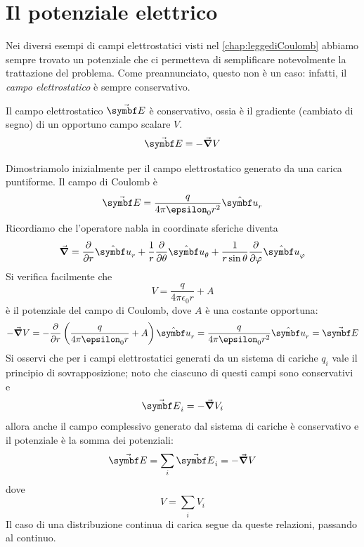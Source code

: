 \section{Il potenziale elettrico}
Nei diversi esempi di campi elettrostatici visti nel \autoref{chap:leggediCoulomb} abbiamo sempre trovato un potenziale che ci permetteva di semplificare notevolmente la trattazione del problema. Come preannunciato, questo non è un caso: infatti, il \textit{campo elettrostatico} è sempre conservativo.
\begin{theorema}
	Il campo elettrostatico $\vba{E}$ è conservativo, ossia è il gradiente (cambiato di segno) di un opportuno campo scalare $V$.
	\begin{equation}
		\vba{E}=-\grad{V}
	\end{equation}
\end{theorema}
\begin{demonstration}
	Dimostriamolo inizialmente per il campo elettrostatico generato da una carica puntiforme.
	Il campo di Coulomb è 
\begin{equation*}
	\vba{E}=\frac{q}{4\pi\epsilon_0r^2}\vbh{u}_r
\end{equation*}
Ricordiamo che l'operatore nabla in coordinate sferiche diventa
\begin{equation*}
	\grad =\pdv{r}\vbh{u}_r+\frac{1}{r}\pdv{\theta}\vbh{u}_\theta+\frac{1}{r\sin\theta}\pdv{\phi}\vbh{u}_\phi
\end{equation*}
Si verifica facilmente che
\begin{equation}
	V=\frac{q}{4\pi\epsilon_0r}+A\label{PotenzialeConst}
\end{equation}
è il potenziale del campo di Coulomb, dove $A$ è una costante opportuna:
\begin{equation*}
	-\grad{V}=-\pdv{r}\left(\frac{q}{4\pi\epsilon_0r}+A\right)\vbh{u}_r=\frac{q}{4\pi\epsilon_0r^2}\vbh{u}_r=\vba{E}
\end{equation*}
Si osservi che per i campi elettrostatici generati da un sistema di cariche $q_i$ vale il principio di sovrapposizione; noto che ciascuno di questi campi sono conservativi e
\begin{equation*}
	\vba{E}_i=-\grad{V}_i
\end{equation*}
allora anche il campo complessivo generato dal sistema di cariche è conservativo e il potenziale è la somma dei potenziali:
\begin{equation}
	\vba{E}=\sum_i\vba{E}_i=-\grad{V}
\end{equation}
dove
\begin{equation}
	V=\sum_iV_i
\end{equation}
Il caso di una distribuzione continua di carica segue da queste relazioni, passando al continuo.
\end{demonstration}\label{CondizionialContornoPot}
